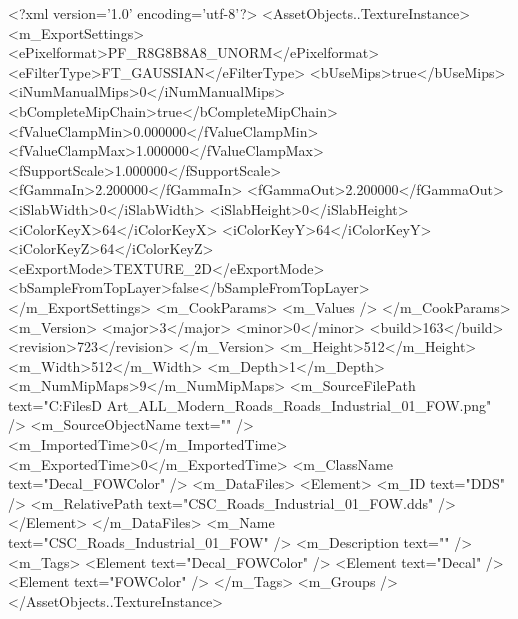 <?xml version='1.0' encoding='utf-8'?>
<AssetObjects..TextureInstance>
  <m_ExportSettings>
    <ePixelformat>PF_R8G8B8A8_UNORM</ePixelformat>
    <eFilterType>FT_GAUSSIAN</eFilterType>
    <bUseMips>true</bUseMips>
    <iNumManualMips>0</iNumManualMips>
    <bCompleteMipChain>true</bCompleteMipChain>
    <fValueClampMin>0.000000</fValueClampMin>
    <fValueClampMax>1.000000</fValueClampMax>
    <fSupportScale>1.000000</fSupportScale>
    <fGammaIn>2.200000</fGammaIn>
    <fGammaOut>2.200000</fGammaOut>
    <iSlabWidth>0</iSlabWidth>
    <iSlabHeight>0</iSlabHeight>
    <iColorKeyX>64</iColorKeyX>
    <iColorKeyY>64</iColorKeyY>
    <iColorKeyZ>64</iColorKeyZ>
    <eExportMode>TEXTURE_2D</eExportMode>
    <bSampleFromTopLayer>false</bSampleFromTopLayer>
  </m_ExportSettings>
  <m_CookParams>
    <m_Values />
  </m_CookParams>
  <m_Version>
    <major>3</major>
    <minor>0</minor>
    <build>163</build>
    <revision>723</revision>
  </m_Version>
  <m_Height>512</m_Height>
  <m_Width>512</m_Width>
  <m_Depth>1</m_Depth>
  <m_NumMipMaps>9</m_NumMipMaps>
  <m_SourceFilePath text="C:\Users\Shadow\Desktop\Working Files\3D Art\Decals\CSC_ALL_Modern_Roads\textures\CSC_Roads_Industrial_01_FOW.png" />
  <m_SourceObjectName text="" />
  <m_ImportedTime>0</m_ImportedTime>
  <m_ExportedTime>0</m_ExportedTime>
  <m_ClassName text="Decal_FOWColor" />
  <m_DataFiles>
    <Element>
      <m_ID text="DDS" />
      <m_RelativePath text="CSC_Roads_Industrial_01_FOW.dds" />
    </Element>
  </m_DataFiles>
  <m_Name text="CSC_Roads_Industrial_01_FOW" />
  <m_Description text="" />
  <m_Tags>
    <Element text="Decal_FOWColor" />
    <Element text="Decal" />
    <Element text="FOWColor" />
  </m_Tags>
  <m_Groups />
</AssetObjects..TextureInstance>